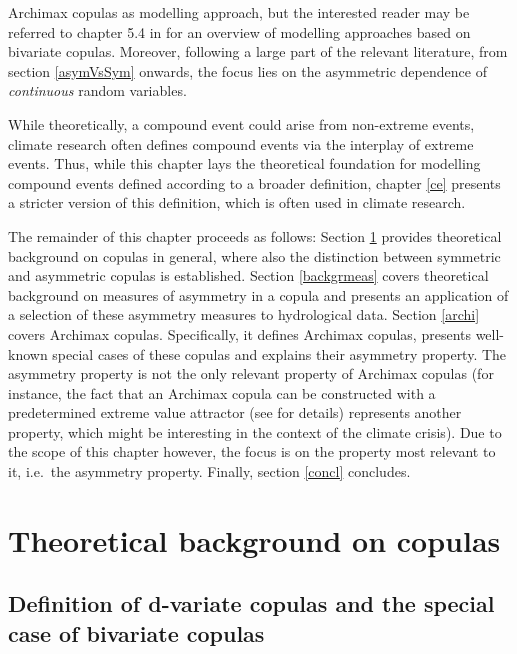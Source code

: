 \documentclass[
]{krantz}
\begin{document}
Archimax copulas as modelling approach, but the interested reader may be referred to chapter 5.4 in \citet{genest2013} for an overview of modelling approaches based on bivariate copulas. Moreover, following a large part of the relevant literature, from section \ref{asymVsSym} onwards, the focus lies on the asymmetric dependence of \emph{continuous} random variables.

While theoretically, a compound event could arise from non-extreme events, climate research often defines compound events via the interplay of extreme events. Thus, while this chapter lays the theoretical foundation for modelling compound events defined according to a broader definition, chapter \ref{ce} presents a stricter version of this definition, which is often used in climate research.

The remainder of this chapter proceeds as follows: Section \ref{backgrcop} provides theoretical background on copulas in general, where also the distinction between symmetric and asymmetric copulas is established. Section \ref{backgrmeas} covers theoretical background on measures of asymmetry in a copula and presents an application of a selection of these asymmetry measures to hydrological data. Section \ref{archi} covers Archimax copulas. Specifically, it defines Archimax copulas, presents well-known special cases of these copulas and explains their asymmetry property. The asymmetry property is not the only relevant property of Archimax copulas (for instance, the fact that an Archimax copula can be constructed with a predetermined extreme value attractor (see \citet{caperaa2000} for details) represents another property, which might be interesting in the context of the climate crisis). Due to the scope of this chapter however, the focus is on the property most relevant to it, i.e.~the asymmetry property. Finally, section \ref{concl} concludes.

\section{Theoretical background on copulas}\label{backgrcop}

\subsection{Definition of d-variate copulas and the special case of bivariate copulas}\label{defcop}
\end{document}
